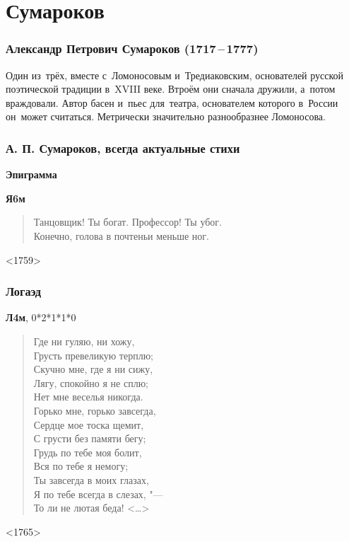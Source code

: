 \documentclass{beamer}
\begin{document}
\section{Сумароков}\label{sec:sum}


\begin{frame}
\frametitle{Александр Петрович Сумароков (1717\,--\,1777)}

Один из~трёх, вместе с~Ломоносовым и~Тредиаковским, основателей русской поэтической традиции в~XVIII веке. Втроём они сначала дружили, а~потом враждовали. Автор басен и~пьес для~театра, основателем которого в~России он~может считаться. Метрически значительно разнообразнее Ломоносова.

\end{frame}


\begin{frame}
\frametitle{А. П. Сумароков, всегда актуальные стихи}
\begin{center}
\textbf{Эпиграмма}
\end{center}

\textbf{Я6м}
\begin{verse}
Танцовщик! Ты богат. Профессор! Ты убог.\\
Конечно, голова в почтеньи меньше ног.
\end{verse}
<1759>
\end{frame}

%

\begin{frame}
\frametitle{Логаэд}

\textbf{Л4м}, 0*2*1*1*0
\begin{verse}
Где ни гуляю, ни хожу,	\\
Грусть превеликую терплю;\\
Скучно мне, где я ни сижу,\\
Лягу, спокойно я не сплю;\\
Нет мне веселья никогда.\\
Горько мне, горько завсегда,\\
Сердце мое тоска щемит,\\
С грусти без памяти бегу;\\
Грудь по тебе моя болит,\\
Вся по тебе я немогу;\\
Ты завсегда в моих глазах,\\
Я по тебе всегда в слезах, "---\\
То ли не лютая беда! <\dots>
\end{verse}
<1765>
\end{frame}
\end{document}
